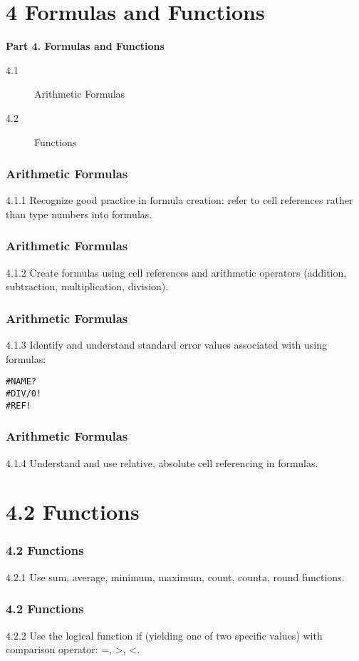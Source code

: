 \documentclass{beamer}
\begin{document}

\section{4 Formulas and Functions }

\begin{frame}
\Large
\textbf{Part 4. Formulas and Functions}
\begin{description}
\item[4.1] Arithmetic Formulas
\item[4.2] Functions
\end{description}
\end{frame}
\begin{frame}
\frametitle{Arithmetic Formulas}
\Large
4.1.1 Recognize good practice in 
formula creation: refer to cell 
references rather than type 
numbers into formulas. 
\end{frame}
\begin{frame}
\frametitle{Arithmetic Formulas}
\Large
4.1.2 Create formulas using cell 
references and arithmetic 
operators (addition, subtraction, 
multiplication, division). 
\end{frame}

\begin{frame}[fragile]
\frametitle{Arithmetic Formulas}
\Large
 4.1.3 Identify and understand standard 
error values associated with 
using formulas: 
\begin{verbatim}
#NAME?
#DIV/0!
#REF! 
\end{verbatim}
\end{frame}
\begin{frame}
\frametitle{Arithmetic Formulas}
\Large
 4.1.4 Understand and use relative, 
absolute cell referencing in 
formulas. 

\end{frame}

\section{4.2 Functions}
\begin{frame}
\frametitle{4.2 Functions}
 4.2.1 Use sum, average, minimum, 
maximum, count, counta, round 
functions.
\end{frame}
\begin{frame}
\frametitle{4.2 Functions}
4.2.2 Use the logical function if 
(yielding one of two specific 
values) with comparison 
operator: =, >, <. 
\end{frame}
\end{document}
